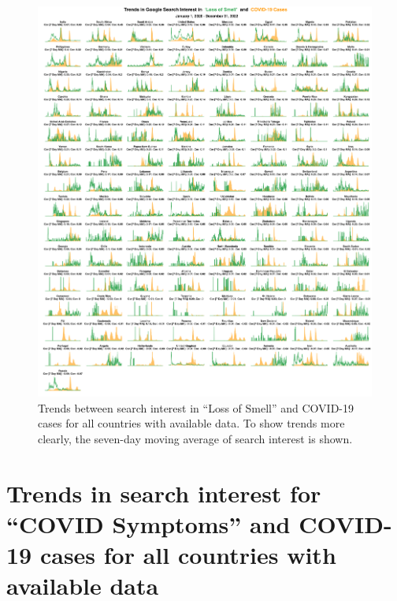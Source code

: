 \documentclass{article}
\begin{document}
\begin{figure}[H]
    \includegraphics[width=1\textwidth]{figures/cases_vs_loss_of_smell_trends_allcountries.png}
    \caption{Trends between search interest in ``Loss of Smell'' and COVID-19 cases for all countries with available data. To show trends more clearly, the seven-day moving average of search interest is shown.}
    \label{fig:cases_vs_loss_of_smell_trends_allcountries}
\end{figure}

\newpage
\section{Trends in search interest for ``COVID Symptoms'' and COVID-19 cases for all countries with available data}
\label{si:covidsymptoms_covid_allcountries}
\end{document}
